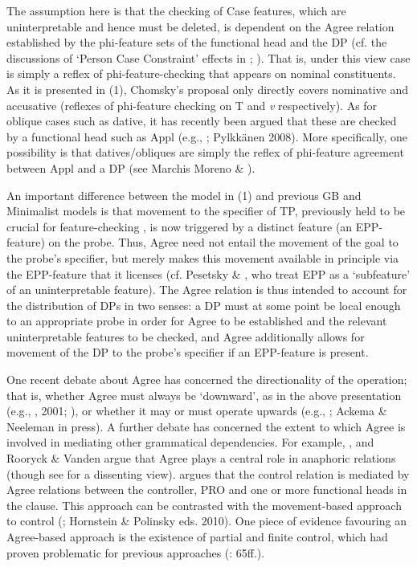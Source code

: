 \documentclass[output=paper]{langsci/langscibook}
\begin{document}
The assumption here is that the checking of Case features, which are uninterpretable and hence must be deleted, is dependent on the Agree relation established by the phi-feature sets of the functional head and the DP (cf. the discussions of ‘Person Case Constraint’ effects in \citealt{Anagnostopoulou2003}; \citealt{Rezac2008}). That is, under this view case is simply a reflex of phi-feature-checking that appears on nominal constituents. As it is presented in (1), Chomsky’s proposal only directly covers nominative and accusative (reflexes of phi-feature checking on T and \textit{v} respectively). As for oblique cases such as dative, it has recently been argued that these are checked by a functional head such as Appl (e.g., \citealt{Cuervo2003}; Pylkkänen 2008). More specifically, one possibility is that datives/obliques are simply the reflex of phi-feature agreement between Appl and a DP (see Marchis Moreno \& \citealt{Franco2017}).

An important difference between the model in (1) and previous GB and Minimalist models is that movement to the specifier of TP, previously held to be crucial for feature-checking \citep{Chomsky1995}, is now triggered by a distinct feature (an EPP-feature) on the probe. Thus, Agree need not entail the movement of the goal to the probe’s specifier, but merely makes this movement available in principle via the EPP-feature that it licenses (cf. Pesetsky \& \citealt{Torrego2001}, who treat EPP as a ‘subfeature’ of an uninterpretable feature). The Agree relation is thus intended to account for the distribution of DPs in two senses: a DP must at some point be local enough to an appropriate probe in order for Agree to be established and the relevant uninterpretable features to be checked, and Agree additionally allows for movement of the DP to the probe’s specifier if an EPP-feature is present.

One recent debate about Agree has concerned the directionality of the operation; that is, whether Agree must always be ‘downward’, as in the above presentation (e.g., \citealt{Chomsky2000}, 2001; \citealt{Preminger2013}), or whether it may or must operate upwards (e.g., \citealt{Zeijlstra2012}; Ackema \& Neeleman in press). A further debate has concerned the extent to which Agree is involved in mediating other grammatical dependencies. For example, \citet{Reuland2001}, \citet{Hicks2009} and Rooryck \& Vanden \citet{Wyngaerd2011} argue that Agree plays a central role in anaphoric relations (though see \citealt{Safir2014} for a dissenting view). \citet{Landau2000} argues that the control relation is mediated by Agree relations between the controller, PRO and one or more functional heads in the clause. This approach can be contrasted with the movement-based approach to control (\citealt{Hornstein1999}; Hornstein \& Polinsky eds. 2010). One piece of evidence favouring an Agree-based approach is the existence of partial and finite control, which had proven problematic for previous approaches (\citealt{Landau2013}: 65ff.).
\end{document}
